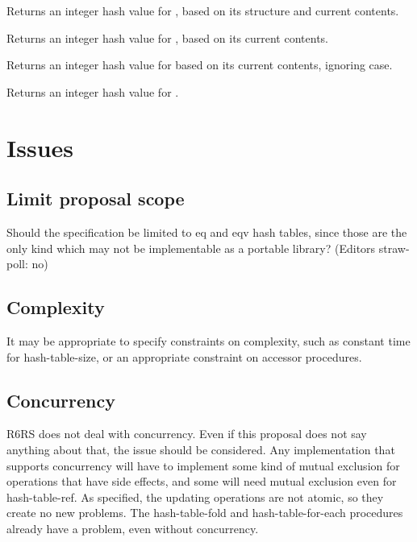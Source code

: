 \documentclass[twoside]{algol60}
\begin{document}
\begin{entry}{}
Returns an integer hash value for , based on its structure and current contents.
\end{entry}

\begin{entry}{}
Returns an integer hash value for , based on its current contents.
\end{entry}

\begin{entry}{}
Returns an integer hash value for  based on its current contents, ignoring case.
\end{entry}

\begin{entry}{}
Returns an integer hash value for .
\end{entry}

\section{Issues}

\subsection{Limit proposal scope}
Should the specification be limited to eq and eqv hash tables, since those are the only kind which may not be implementable as a portable library? (Editors straw-poll: no)

\subsection{Complexity}
It may be appropriate to specify constraints on complexity, such as constant time for hash-table-size, or an appropriate constraint on accessor procedures.

\subsection{Concurrency}
R6RS does not deal with concurrency.  Even if this proposal does not say anything about that, the issue should be considered.  Any implementation that supports concurrency will have to implement some kind of mutual exclusion for operations that have side effects, and some will need mutual exclusion even for {\cf hash-table-ref}.  As specified, the updating operations are not atomic, so they create no new problems.  The {\cf hash-table-fold} and {\cf hash-table-for-each} procedures already have a problem, even without concurrency.
\end{document}
